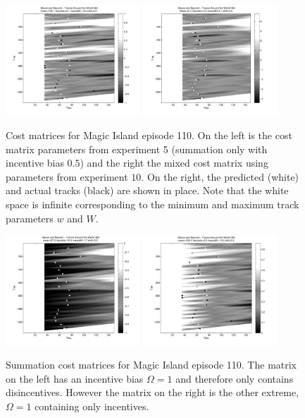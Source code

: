 \documentclass[twocolumn]{article}
\begin{document}
	\begin{figure}[t]
		\centering
		\includegraphics[width=0.45\textwidth]{images/cm5}
		\includegraphics[width=0.45\textwidth]{images/cm10}
		\caption{Cost matrices for Magic Island episode 110. On the left is the cost matrix parameters from experiment 5 (summation only with incentive bias $0.5$) and the right the mixed cost matrix using parameters from experiment $10$. On the right, the predicted (white) and actual tracks (black) are shown in place. Note that the white space is infinite corresponding to the minimum and maximum track parameters $w$ and $W$.}
		\label{fig:cost_matrices}
	\end{figure} 
	
		\begin{figure}[t]
			\centering
			\includegraphics[width=0.45\textwidth]{images/cmsumib1}
			\includegraphics[width=0.45\textwidth]{images/cmsumib0}
			\caption{Summation cost matrices for Magic Island episode 110. The matrix on the left has an incentive bias $\Omega=1$ and therefore only contains disincentives. However the matrix on the right is the other extreme, $\Omega=1$ containing only incentives. }
			\label{fig:cmsumib1}
		\end{figure} 
	
\end{document}
